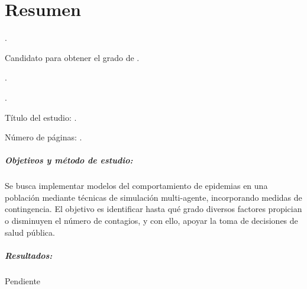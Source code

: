 
\chapter{Resumen}

{\setlength{\leftskip}{10mm}
\setlength{\parindent}{-10mm}

\autor.

Candidato para obtener el grado de \grado\orientacion.

\uanl.

\fime.

Título del estudio: \textsc{\titulo}.

\noindent Número de páginas: \pageref*{lastpage}.}

\paragraph{Objetivos y método de estudio:}

Se busca implementar modelos del comportamiento de epidemias en una población mediante
técnicas de simulación multi-agente, incorporando medidas de contingencia. El objetivo
es identificar hasta qué grado diversos factores propician o disminuyen el número de
contagios, y con ello, apoyar la toma de decisiones de salud pública.


\paragraph{Resultados:}
Pendiente


